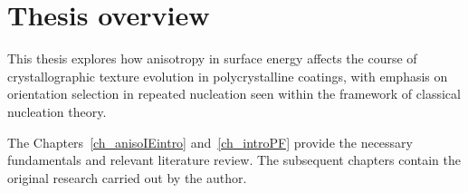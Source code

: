%



\section{Thesis overview} \label{sec_Thesis_overview}
This thesis explores how anisotropy in surface energy affects the course of crystallographic texture evolution in polycrystalline coatings, with emphasis on orientation selection in repeated nucleation seen within the framework of classical nucleation theory. 


The Chapters~\ref{ch_anisoIEintro} and~\ref{ch_introPF} provide the necessary fundamentals and relevant literature review. The subsequent chapters contain the original research carried out by the author.

